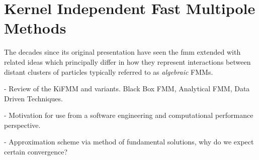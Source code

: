
\section{Kernel Independent Fast Multipole Methods}\label{chpt:fmm:sec:kifmm}

The decades since its original presentation have seen the \acrshort{fmm} extended with related ideas which principally differ in how they represent interactions between distant clusters of particles typically referred to as \textit{algebraic} FMMs.

- Review of the KiFMM and variants. Black Box FMM, Analytical FMM, Data Driven Techniques.

- Motivation for use from a software engineering and computational performance perspective.

- Approximation scheme via method of fundamental solutions, why do we expect certain convergence?

